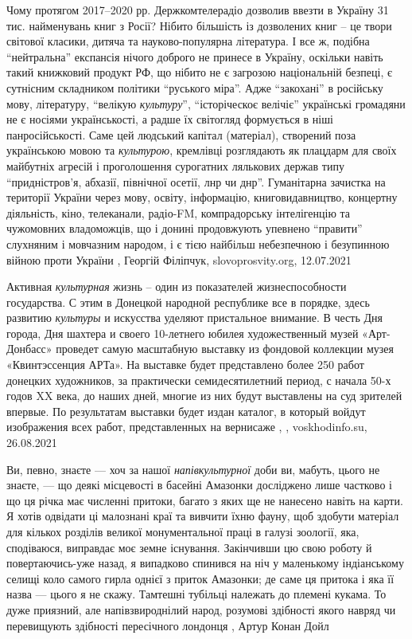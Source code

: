 Чому протягом 2017–2020 рр. Держкомтелерадіо дозволив ввезти в Україну 31 тис.
найменувань книг з Росії? Нібито більшість із дозволених книг – це твори
світової класики, дитяча та науково-популярна література. І все ж, подібна
\enquote{нейтральна} експансія нічого доброго не принесе в Україну, оскільки навіть
такий книжковий продукт РФ, що нібито не є загрозою національній безпеці, є
сутнісним складником політики \enquote{руського міра}. Адже \enquote{закохані} в російську
мову, літературу, \enquote{велікую \emph{культуру}}, \enquote{історіческоє велічіє} українські
громадяни не є носіями українськості, а радше їх світогляд формується в ніші
панросійськості. Саме цей людський капітал (матеріал), створений поза
українською мовою та \emph{культурою}, кремлівці розглядають як плацдарм для своїх
майбутніх агресій і проголошення сурогатних лялькових держав типу
\enquote{придністров’я, абхазії, північної осетії, лнр чи днр}. Гуманітарна зачистка на
території України через мову, освіту, інформацію, книговидавництво, концертну
діяльність, кіно, телеканали, радіо-FM, компрадорську інтелігенцію та
чужомовних владоможців, що і донині продовжують упевнено \enquote{правити} слухняним і
мовчазним народом, і є тією найбільш небезпечною і безупинною війною проти
України
, Георгій Філіпчук, slovoprosvity.org, 12.07.2021

Активная \emph{культурная} жизнь – один из показателей жизнеспособности
государства. С этим в Донецкой народной республике все в порядке, здесь
развитию \emph{культуры} и искусства уделяют пристальное внимание.  В честь Дня
города, Дня шахтера и своего 10-летнего юбилея художественный музей
«Арт-Донбасс» проведет самую масштабную выставку из фондовой коллекции музея
«Квинтэссенция АРТа».  На выставке будет представлено более 250 работ донецких
художников, за практически семидесятилетний период, с начала 50-х годов XX
века, до наших дней, многие из них будут выставлены на суд зрителей впервые. По
результатам выставки будет издан каталог, в который войдут изображения всех
работ, представленных на вернисаже
, , voskhodinfo.su, 26.08.2021

Ви, певно, знаєте — хоч за нашої \emph{напівкультурної} доби ви, мабуть, цього не
знаєте, — що деякі місцевості в басейні Амазонки досліджено лише частково і що
ця річка має численні притоки, багато з яких ще не нанесено навіть на карти. Я
хотів одвідати ці малознані краї та вивчити їхню фауну, щоб здобути матеріал
для кількох розділів великої монументальної праці в галузі зоології, яка,
сподіваюся, виправдає моє земне існування. Закінчивши цю свою роботу й
повертаючись-уже назад, я випадково спинився на ніч у маленькому індіанському
селищі коло самого гирла однієї з приток Амазонки; де саме ця притока і яка її
назва — цього я не скажу. Тамтешні тубільці належать до племені кукама. То дуже
приязний, але напівзвироднілий народ, розумові здібності якого навряд чи
перевищують здібності пересічного лондонця
, Артур Конан Дойл

